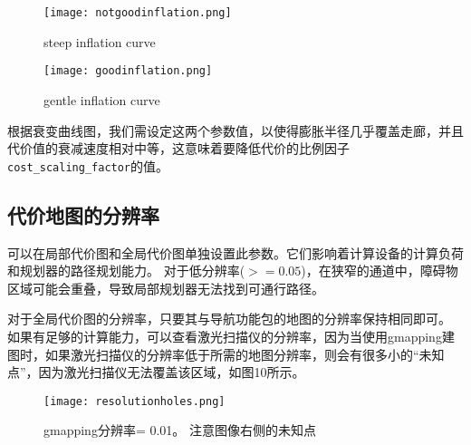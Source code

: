 \begin{figure}[!htb]
	\texttt{[image: notgoodinflation.png]}
	\caption{steep inflation curve}
	\endminipage\hfill
	\texttt{[image: goodinflation.png]}
	\caption{gentle inflation curve}
	\endminipage\hfill
\end{figure}


根据衰变曲线图，我们需设定这两个参数值，以使得膨胀半径几乎覆盖走廊，并且代价值的衰减速度相对中等，这意味着要降低代价的比例因子\texttt{cost\_scaling\_factor}的值。

\subsection[costmap resolution]{代价地图的分辨率}%
可以在局部代价图和全局代价图单独设置此参数。它们影响着计算设备的计算负荷和规划器的路径规划能力。
对于低分辨率($>=0.05$)，在狭窄的通道中，障碍物区域可能会重叠，导致局部规划器无法找到可通行路径。


对于全局代价图的分辨率，只要其与导航功能包的地图的分辨率保持相同即可。
如果有足够的计算能力，可以查看激光扫描仪的分辨率，因为当使用gmapping建图时，如果激光扫描仪的分辨率低于所需的地图分辨率，则会有很多小的“未知点”，因为激光扫描仪无法覆盖该区域，如图10所示。


\begin{figure}[!h]
	\begin{center}
		\texttt{[image: resolutionholes.png]}
		\caption{gmapping分辨率= 0.01。 注意图像右侧的未知点}
	\end{center}
\end{figure}


